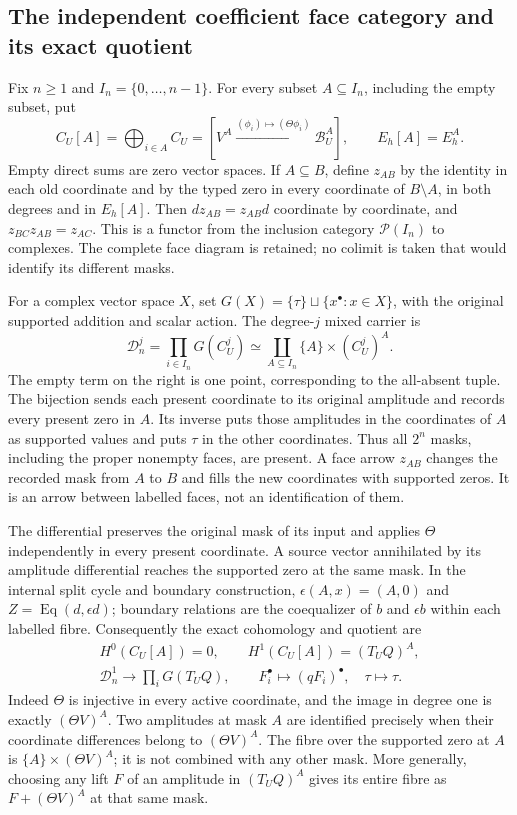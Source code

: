 \documentclass[11pt,a4paper]{article}
\begin{document}
\subsection{The independent coefficient face category and its exact quotient}

Fix $n\geq1$ and $I_n=\{0,\ldots,n-1\}$.  For every subset
$A\subseteq I_n$, including the empty subset, put
\[
C_U[A]=\bigoplus_{i\in A}C_U
 =[V^A\xrightarrow{(\phi_i)\mapsto(\Theta\phi_i)}\mathscr B_U^A],
\qquad E_h[A]=E_h^A.
\tag{MCF6}
\]
Empty direct sums are zero vector spaces.  If $A\subseteq B$, define
$z_{AB}$ by the identity in each old coordinate and by the typed zero in
every coordinate of $B\setminus A$, in both degrees and in $E_h[A]$.
Then $d z_{AB}=z_{AB}d$ coordinate by coordinate, and
$z_{BC}z_{AB}=z_{AC}$.  This is a functor from the inclusion category
$\mathcal P(I_n)$ to complexes.  The complete face diagram is retained;
no colimit is taken that would identify its different masks.

For a complex vector space $X$, set
$G(X)=\{\tau\}\sqcup\{x^\bullet:x\in X\}$, with the original supported
addition and scalar action.  The degree-$j$ mixed carrier is
\[
\mathscr D_n^j=\prod_{i\in I_n}G(C_U^j)
\simeq\coprod_{A\subseteq I_n}\{A\}\times(C_U^j)^A.
\tag{MCF7}
\]
The empty term on the right is one point, corresponding to the all-absent
tuple.  The bijection sends each present coordinate to its original
amplitude and records every present zero in $A$.  Its inverse puts those
amplitudes in the coordinates of $A$ as supported values and puts $\tau$
in the other coordinates.  Thus all $2^n$ masks, including the proper
nonempty faces, are present.  A face arrow $z_{AB}$ changes the recorded
mask from $A$ to $B$ and fills the new coordinates with supported zeros.
It is an arrow between labelled faces, not an identification of them.

The differential preserves the original mask of its input and applies
$\Theta$ independently in every present coordinate.  A source vector
annihilated by its amplitude differential reaches the supported zero at
the same mask.  In the internal split cycle and boundary construction,
$\epsilon(A,x)=(A,0)$ and
$Z=\operatorname{Eq}(d,\epsilon d)$; boundary relations are the
coequalizer of $b$ and $\epsilon b$ within each labelled fibre.
Consequently the exact cohomology and quotient are
\[
\begin{gathered}
H^0(C_U[A])=0,\qquad H^1(C_U[A])=(T_UQ)^A,\\
\mathscr D_n^1\longrightarrow\prod_iG(T_UQ),\qquad
F_i^\bullet\longmapsto(qF_i)^\bullet,\quad\tau\longmapsto\tau.
\end{gathered}
\tag{MCF8}
\]
Indeed $\Theta$ is injective in every active coordinate, and the image
in degree one is exactly $(\Theta V)^A$.  Two amplitudes at mask $A$
are identified precisely when their coordinate differences belong to
$(\Theta V)^A$.  The fibre over the supported zero at $A$ is
$\{A\}\times(\Theta V)^A$; it is not combined with any other mask.
More generally, choosing any lift $F$ of an amplitude in $(T_UQ)^A$
gives its entire fibre as $F+(\Theta V)^A$ at that same mask.
\end{document}

